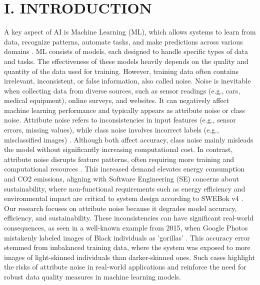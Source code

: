 \documentclass[conference]{IEEEtran}
\begin{document}
\section*{I. INTRODUCTION}
A key aspect of AI is Machine Learning (ML), which allows systems to learn from data, recognize patterns, automate tasks, and make predictions across various domains \cite{google_ai_ml}.
ML consists of models, each designed to handle specific types of data and tasks. The effectiveness of these models heavily depends on the quality and quantity of the data used for training.
However, training data often contains irrelevant, inconsistent, or false information, also called noise.
\newline
\newline
Noise is inevitable when collecting data from diverse sources, such as sensor readings (e.g., cars, medical equipment), online surveys, and websites. It can negatively affect machine learning performance and typically appears as attribute noise or class noise. Attribute noise refers to inconsistencies in input features (e.g., sensor errors, missing values), while class noise involves incorrect labels (e.g., misclassified images) \cite{dataheroes_noise}. 
\newline
\newline
Although both affect accuracy, class noise mainly misleads the model without significantly increasing computational cost. In contrast, attribute noise disrupts feature patterns, often requiring more training and computational resources \cite{wuzu}. This increased demand elevates energy consumption and CO2 emissions, aligning with Software Engineering (SE) concerns about sustainability, where non-functional requirements such as energy efficiency and environmental impact are critical to system design according to SWEBok v4 \cite[p. 69]{sweb}.
\newline
\newline
Our research focuses on attribute noise because it degrades model accuracy, efficiency, and sustainability. These inconsistencies can have significant real-world consequences, as seen in a well-known example from 2015, when Google Photos mistakenly labeled images of Black individuals as 'gorillas' \cite{guardian2015}. This accuracy error stemmed from imbalanced training data, where the system was exposed to more images of light-skinned individuals than darker-skinned ones. Such cases highlight the risks of attribute noise in real-world applications and reinforce the need for robust data quality measures in machine learning models.
\end{document}
